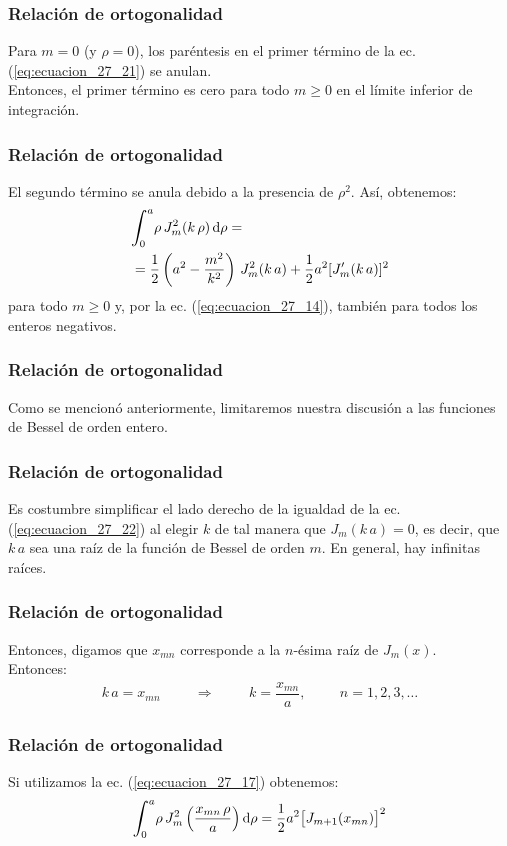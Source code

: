 \documentclass[12pt]{beamer}
\begin{document}
\begin{frame}
\frametitle{Relación de ortogonalidad}
Para $m = 0$ (y $\rho = 0$), los paréntesis en el primer término de la ec. (\ref{eq:ecuacion_27_21}) se anulan. 
\\
\bigskip
\pause
Entonces, el primer término es cero para todo $m \geq 0$ en el límite inferior de integración.
\end{frame}
\begin{frame}
\frametitle{Relación de ortogonalidad}
El segundo término se anula debido a la presencia de $\rho^{2}$. \pause Así, obtenemos:
\pause
\begin{equation}
\begin{aligned}[b]
&\scaleint{6ex}_{\bs 0}^{a} \rho \, J_{m}^{2} ( k \, \rho) \dd{\rho} = \\
&= \dfrac{1}{2} \left( a^{2} - \dfrac{m^{2}}{k^{2}} \right) \, J_{m}^{2} (k \, a) + \dfrac{1}{2} a^{2} [J_{m}^{\prime} (k \, a)]^{2}
\end{aligned}
\label{eq:ecuacion_27_22}
\end{equation}
\pause
para todo $m \geq 0$ y, por la ec. (\ref{eq:ecuacion_27_14}), también para todos los enteros negativos.
\end{frame}
\begin{frame}
\frametitle{Relación de ortogonalidad}
Como se mencionó anteriormente, limitaremos nuestra discusión a las funciones de Bessel de orden entero.
\end{frame}
\begin{frame}
\frametitle{Relación de ortogonalidad}
Es costumbre simplificar el lado derecho de la igualdad de la ec. (\ref{eq:ecuacion_27_22}) al elegir $k$ de tal manera que $J_{m} (k \, a) = 0$, es decir, que $k \, a$ sea una raíz de la función de Bessel de orden $m$. \pause En general, hay infinitas raíces.
\end{frame}
\begin{frame}
\frametitle{Relación de ortogonalidad}
Entonces, digamos que $x_{mn}$ corresponde a la $n$-ésima raíz de $J_m (x)$.
\\
\bigskip
\pause
Entonces:
\pause
\begin{align*}
k \, a = x_{mn} \hspace{1cm} \Longrightarrow \hspace{1cm} k = \dfrac{x_{mn}}{a}, \hspace{1cm} n = 1, 2, 3, \ldots
\end{align*}
\end{frame}
\begin{frame}
\frametitle{Relación de ortogonalidad}
Si utilizamos la ec. (\ref{eq:ecuacion_27_17}) obtenemos:
\pause
\begin{equation}
\scaleint{6ex}_{\bs 0}^{a} \rho \, J_{m}^{2} \left(\dfrac{x_{mn} \, \rho}{a}   \right) \dd{\rho} = \dfrac{1}{2} a^{2} \big[ J_{m+1} (x_{mn}) \big]^{2}
\label{eq:ecuacion_27_23}
\end{equation}
\end{frame}
\end{document}

